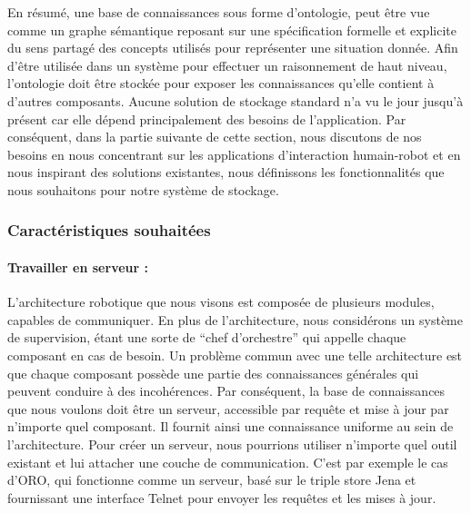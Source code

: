 En résumé, une base de connaissances sous forme d'ontologie, peut être vue comme un graphe sémantique reposant sur une spécification formelle et explicite du sens partagé des concepts utilisés pour représenter une situation donnée. Afin d'être utilisée dans un système pour effectuer un raisonnement de haut niveau, l'ontologie doit être stockée pour exposer les connaissances qu'elle contient à d'autres composants. Aucune solution de stockage standard n'a vu le jour jusqu'à présent car elle dépend principalement des besoins de l'application. Par conséquent, dans la partie suivante de cette section, nous discutons de nos besoins en nous concentrant sur les applications d'interaction humain-robot et en nous inspirant des solutions existantes, nous définissons les fonctionnalités que nous souhaitons pour notre système de stockage.

\subsubsection*{Caractéristiques souhaitées}

\paragraph{Travailler en serveur :} L'architecture robotique que nous visons est composée de plusieurs modules, capables de communiquer. En plus de l'architecture, nous considérons un système de supervision, étant une sorte de ``chef d'orchestre'' qui appelle chaque composant en cas de besoin. Un problème commun avec une telle architecture est que chaque composant possède une partie des connaissances générales qui peuvent conduire à des incohérences. Par conséquent, la base de connaissances que nous voulons doit être un serveur, accessible par requête et mise à jour par n'importe quel composant. Il fournit ainsi une connaissance uniforme au sein de l'architecture. Pour créer un serveur, nous pourrions utiliser n'importe quel outil existant et lui attacher une couche de communication. C'est par exemple le cas d'ORO, qui fonctionne comme un serveur, basé sur le triple store Jena et fournissant une interface Telnet pour envoyer les requêtes et les mises à jour.

